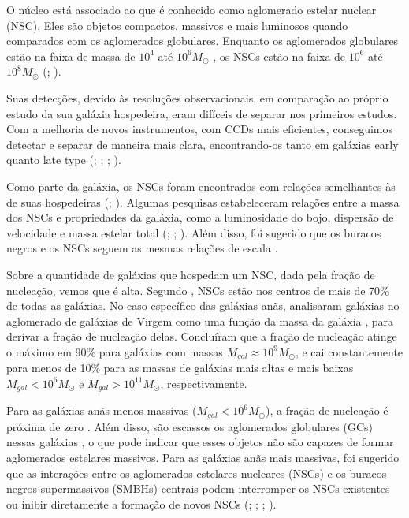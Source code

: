 O núcleo está associado ao que é conhecido como aglomerado estelar nuclear (NSC). Eles são objetos compactos, massivos e mais luminosos quando comparados com os aglomerados globulares. Enquanto os aglomerados globulares estão na faixa de massa de $10^4$ até $10^6 M_{\odot}$ \citep{Masters_2010}, os NSCs estão na faixa de $10^6$ até $10^8 M_{\odot}$ (\citealp{Spengler_2017}; \citealp{Georgiev_2016}).

Suas detecções, devido às resoluções observacionais, em comparação ao próprio estudo da sua galáxia hospedeira, eram difíceis de separar nos primeiros estudos. Com a melhoria de novos instrumentos, com CCDs mais eficientes, conseguimos detectar e separar de maneira mais clara, encontrando-os tanto em galáxias early quanto late type (\citealp{Phillips_1996}; \citealp{Carollo_1997}; \citealp{Matthews_1999}; \citealp{boker_2002}).

Como parte da galáxia, os NSCs foram encontrados com relações semelhantes às de suas hospedeiras (\citealp{Balcells_2003}; \citealp{Graham_2003}). Algumas pesquisas estabeleceram relações entre a massa dos NSCs e propriedades da galáxia, como a luminosidade do bojo, dispersão de velocidade e massa estelar total (\citep{Ferrarese_2006};  \citep{Wehner_2006};  \citep{Rossa_2006}). Além disso, foi sugerido que os buracos negros e os NSCs seguem as mesmas relações de escala \citep{Ferrarese_2006}.

Sobre a quantidade de galáxias que hospedam um NSC, dada pela fração de nucleação, vemos que é alta. Segundo \cite{Boker_2010}, NSCs estão nos centros de mais de 70\% de todas as galáxias. No caso específico das galáxias anãs, analisaram galáxias no aglomerado de galáxias de Virgem como uma função da massa da galáxia \citep{Sanchez_2019}, para derivar a fração de nucleação delas. Concluíram que a fração de nucleação atinge o máximo em 90\% para galáxias com massas $M_{gal} \approx 10^9 M_{\odot}$, e cai constantemente para menos de 10\% para as massas de galáxias mais altas e mais baixas $M_{gal} < 10^6 M_{\odot}$ e $M_{gal} > 10^{11} M_{\odot}$, respectivamente.

Para as galáxias anãs menos massivas ($M_{gal} < 10^6 M_{\odot}$), a fração de nucleação é próxima de zero \citep{Ordenes_2018}. Além disso, são escassos os aglomerados globulares (GCs) nessas galáxias \citep{Forbes_2018}, o que pode indicar que esses objetos não são capazes de formar aglomerados estelares massivos. Para as galáxias anãs mais massivas, foi sugerido que as interações entre os aglomerados estelares nucleares (NSCs) e os buracos negros supermassivos (SMBHs) centrais podem interromper os NSCs existentes ou inibir diretamente a formação de novos NSCs (\citealp{Cote_2006}; \citealp{Neumayer_2012}; \citealp{Antonini_2015}; \citealp{Arca_2016}).

